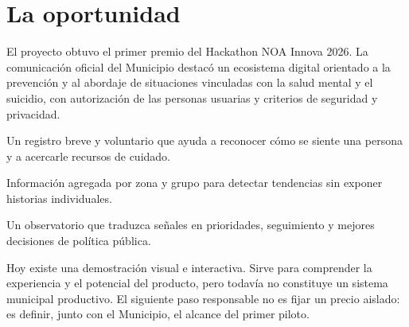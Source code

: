 \documentclass[11pt,a4paper]{article}
\begin{document}
\RaggedRight

\makeanimacover

\section{La oportunidad}

\begin{navycard}
  El proyecto obtuvo el primer premio del Hackathon NOA Innova 2026. La comunicación oficial del Municipio destacó un ecosistema digital orientado a la prevención y al abordaje de situaciones vinculadas con la salud mental y el suicidio, con autorización de las personas usuarias y criterios de seguridad y privacidad.
\end{navycard}

\vspace{5mm}
\begin{minipage}[t]{.31\textwidth}
  \begin{softcard}[height=42mm]
    Un registro breve y voluntario que ayuda a reconocer cómo se siente una persona y a acercarle recursos de cuidado.
  \end{softcard}
\end{minipage}\hfill
\begin{minipage}[t]{.31\textwidth}
  \begin{softcard}[height=42mm]
    Información agregada por zona y grupo para detectar tendencias sin exponer historias individuales.
  \end{softcard}
\end{minipage}\hfill
\begin{minipage}[t]{.31\textwidth}
  \begin{softcard}[height=42mm]
    Un observatorio que traduzca señales en prioridades, seguimiento y mejores decisiones de política pública.
  \end{softcard}
\end{minipage}

\vspace{4mm}
\begin{terracard}
  Hoy existe una demostración visual e interactiva. Sirve para comprender la experiencia y el potencial del producto, pero todavía no constituye un sistema municipal productivo. El siguiente paso responsable no es fijar un precio aislado: es definir, junto con el Municipio, el alcance del primer piloto.
\end{terracard}
\end{document}
